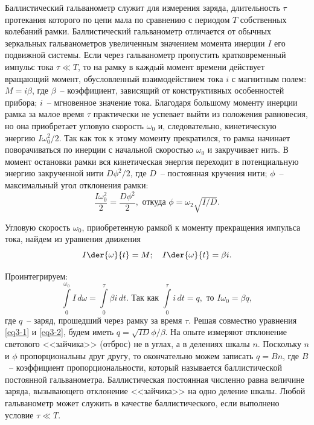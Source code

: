 \documentclass[pscyr]{hedwork}
\begin{document}
  Баллистический гальванометр служит для измерения заряда, длительность
  \( \tau \) протекания которого по цепи мала по сравнению с периодом \( T \)
  собственных колебаний рамки. Баллистический гальванометр отличается от обычных
  зеркальных гальванометров увеличенным значением момента инерции \( I \) его
  подвижной системы. Если через гальванометр пропустить кратковременный импульс
  тока \( \tau \ll T \), то на рамку в каждый момент времени действует вращающий
  момент, обусловленный взаимодействием тока \( i \) с магнитным полем:
  \( M = i\beta \), где \( \beta \)~-- коэффициент, зависящий от конструктивных
  особенностей прибора; \( i \)~-- мгновенное значение тока. Благодаря большому
  моменту инерции рамка за малое время \( \tau \) практически не успевает выйти
  из положения равновесия, но она приобретает угловую скорость \( \omega_0 \) и,
  следовательно, кинетическую энергию \( I\omega_0^2/2 \). Так как ток к этому
  моменту прекратился, то рамка начинает поворачиваться по инерции с начальной
  скоростью \( \omega_0 \) и закручивает нить. В момент остановки рамки вся
  кинетическая энергия переходит в потенциальную энергию закрученной нити
  \( D\phi^2/2 \), где \( D \)~-- постоянная кручения нити; \( \phi \)~--
  максимальный угол отклонения рамки:
  \begin{equation}
    \frac{I\omega_0^2}{2} = \frac{D\phi^2}{2}, \text{ откуда }
    \phi = \omega_2\sqrt{I/D}.
    \label{eq3-1}
  \end{equation}

  Угловую скорость \( \omega_0 \), приобретенную рамкой к моменту прекращения
  импульса тока, найдем из уравнения движения
  \[
    I\der{\omega}{t} = M; \quad I\der{\omega}{t} = \beta i.
  \]

  Проинтегрируем:
  \begin{equation}
    \int\limits_0^{\omega_0} I\,d\omega = \int\limits_0^\tau \beta i\,dt.
    \text{ Так как } \int\limits_0^\tau i\,dt = q, \text{ то }
    I\omega_0 = \beta q,
    \label{eq3-2}
  \end{equation}
  где \( q \)~-- заряд, прошедший через рамку за время \( \tau \). Решая
  совместно уравнения \eqref{eq3-1} и \eqref{eq3-2}, будем иметь
  \( q = \sqrt{ID}\phi/\beta \). На опыте измеряют отклонение светового
  <<зайчика>> (отброс) не в углах, а в делениях шкалы \( n \). Поскольку
  \( n \) и \( \phi \) пропорциональны друг другу, то окончательно можем
  записать \( q = Bn \), где \( B \)~-- коэффициент пропорциональности, который
  называется баллистической постоянной гальванометра. Баллистическая постоянная
  численно равна величине заряда, вызывающего отклонение <<зайчика>> на одно
  деление шкалы. Любой гальванометр может служить в качестве баллистического,
  если выполнено условие \( \tau \ll T \).
\end{document}
